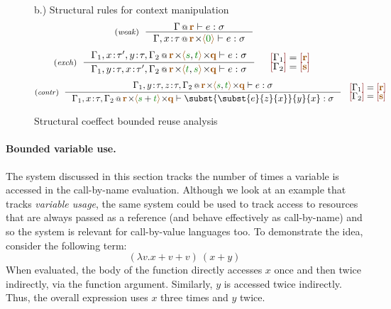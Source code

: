\begin{figure}[t]
{\small b.) Structural rules for context manipulation}
\begin{equation*}
\tyrule{weak}
  {\coctx{\Gamma}{ \aclrd{\textbf{r}} } \vdash e : \sigma}
  {\coctx{\Gamma,x \!:\! \tau}{\aclrd{\textbf{r}} \cons \alift{ \cclrd{0} }} \vdash e : \sigma} 
\end{equation*}
\begin{equation*}
\tyrule{exch}
  {\coctx{\Gamma_1,x\!:\!\tau',y\!:\!\tau,\Gamma_2}{\aclrd{\textbf{r}} \cons\alift{\cclrd{s},\cclrd{t}} \cons \aclrd{\textbf{q}}} \vdash e : \sigma}
  {\coctx{\Gamma_1,y\!:\!\tau,x\!:\!\tau',\Gamma_2}{\aclrd{\textbf{r}} \cons\alift{\cclrd{t},\cclrd{s}} \cons \aclrd{\textbf{q}}} \vdash e : \sigma}
\quad
\begin{array}{l}
\slift{\Gamma_1} = \slift{\aclrd{\textbf{r}}}\\[-0.25em]
\slift{\Gamma_2} = \slift{\aclrd{\textbf{s}}}
\end{array}
\end{equation*}
\begin{equation*}
\tyrule{contr}
  {\coctx{\Gamma_1,y\!:\!\tau,z\!:\!\tau,\Gamma_2}{\aclrd{\textbf{r}} \cons \alift{\cclrd{s},\cclrd{t}} \cons \aclrd{\textbf{q}}} \vdash e : \sigma}
  {\coctx{\Gamma_1,x\!:\!\tau,\Gamma_2}{\aclrd{\textbf{r}} \cons \alift{\cclrd{s}+\cclrd{t}} \cons \aclrd{\textbf{q}}} \vdash \subst{\subst{e}{z}{x}}{y}{x} : \sigma}
~
\begin{array}{l}
\slift{\Gamma_1} = \slift{\aclrd{\textbf{r}}}\\[-0.25em]
\slift{\Gamma_2} = \slift{\aclrd{\textbf{s}}}
\end{array}
\end{equation*}

\caption{Structural coeffect bounded reuse analysis}
\label{fig:applications-struct-bll}
\vspace{-1em}
\end{figure}


\paragraph{Bounded variable use.} 
The system discussed in this section tracks the number of times a variable is accessed in the 
call-by-name evaluation. Although we look at an example that tracks \emph{variable usage}, the same
system could be used to track access to resources that are always passed as a reference (and behave
effectively as call-by-name) and so the system is relevant for call-by-value languages too.
To demonstrate the idea, consider the following term:
%
\begin{equation*}
(\lambda v.x + v + v)~(x+y)
\end{equation*}
%
When evaluated, the body of the function directly accesses $x$ once and then twice indirectly, via
the function argument. Similarly, $y$ is accessed twice indirectly. Thus, the overall expression uses
$x$ three times and $y$ twice.


